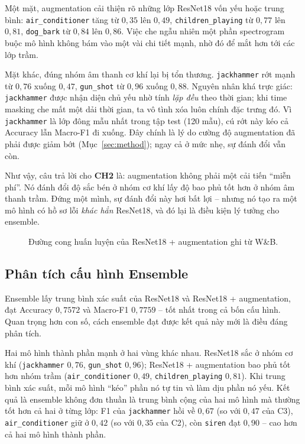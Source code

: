 Một mặt, augmentation cải thiện rõ những lớp ResNet18 vốn yếu hoặc trung bình:
\texttt{air\_conditioner} tăng từ $0{,}35$ lên $0{,}49$, \texttt{children\_playing}
từ $0{,}77$ lên $0{,}81$, \texttt{dog\_bark} từ $0{,}84$ lên $0{,}86$. Việc che
ngẫu nhiên một phần spectrogram buộc mô hình không bám vào một vài chi tiết
mạnh, nhờ đó để mắt hơn tới các lớp trầm.

Mặt khác, đúng nhóm âm thanh cơ khí lại bị tổn thương. \texttt{jackhammer} rớt
mạnh từ $0{,}76$ xuống $0{,}47$, \texttt{gun\_shot} từ $0{,}96$ xuống $0{,}88$.
Nguyên nhân khá trực giác: \texttt{jackhammer} được nhận diện chủ yếu nhờ tính
\textit{lặp đều} theo thời gian; khi time masking che mất một dải thời gian, ta
vô tình xóa luôn chính đặc trưng đó. Vì \texttt{jackhammer} là lớp đông mẫu nhất
trong tập test (120 mẫu), cú rớt này kéo cả Accuracy lẫn Macro-F1 đi xuống. Đây
chính là lý do cường độ augmentation đã phải được giảm bớt (Mục~\ref{sec:method});
ngay cả ở mức nhẹ, sự đánh đổi vẫn còn.

Như vậy, câu trả lời cho \textbf{CH2} là: augmentation không phải một cải tiến
``miễn phí''. Nó đánh đổi độ sắc bén ở nhóm cơ khí lấy độ bao phủ tốt hơn ở nhóm
âm thanh trầm. Đứng một mình, sự đánh đổi này hơi bất lợi -- nhưng nó tạo ra một
mô hình có hồ sơ lỗi \textit{khác hẳn} ResNet18, và đó lại là điều kiện lý tưởng
cho ensemble.

\begin{figure}[H]
  \centering
  \caption{Đường cong huấn luyện của ResNet18 + augmentation ghi từ W\&B.}
  \label{fig:wandbaug}
\end{figure}

\subsection{Phân tích cấu hình Ensemble}
\label{ssec:ensemble}

Ensemble lấy trung bình xác suất của ResNet18 và ResNet18 + augmentation, đạt
Accuracy $0{,}7572$ và Macro-F1 $0{,}7759$ -- tốt nhất trong cả bốn cấu hình.
Quan trọng hơn con số, cách ensemble đạt được kết quả này mới là điều đáng phân
tích.

Hai mô hình thành phần mạnh ở hai vùng khác nhau. ResNet18 sắc ở nhóm cơ khí
(\texttt{jackhammer} $0{,}76$, \texttt{gun\_shot} $0{,}96$); ResNet18 +
augmentation bao phủ tốt hơn nhóm trầm (\texttt{air\_conditioner} $0{,}49$,
\texttt{children\_playing} $0{,}81$). Khi trung bình xác suất, mỗi mô hình ``kéo''
phần nó tự tin và làm dịu phần nó yếu. Kết quả là ensemble không đơn thuần là
trung bình cộng của hai mô hình mà thường tốt hơn cả hai ở từng lớp: F1 của
\texttt{jackhammer} hồi về $0{,}67$ (so với $0{,}47$ của C3), \texttt{air\_conditioner}
giữ ở $0{,}42$ (so với $0{,}35$ của C2), còn \texttt{siren} đạt $0{,}90$ -- cao
hơn cả hai mô hình thành phần.

